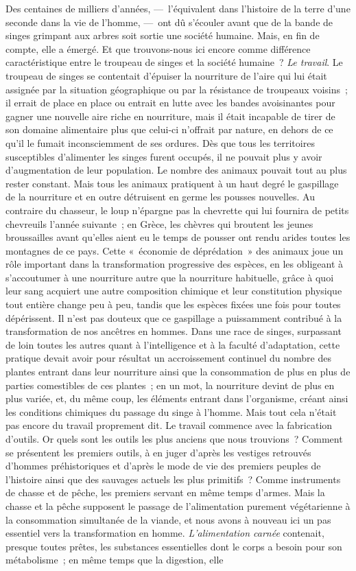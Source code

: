 \documentclass[french,twoside]{book} %
\begin{document}
Des centaines de milliers d’années, — l’équivalent dans l’histoire de la terre d’une seconde dans la vie de l’homme, — ont dû s’écouler avant que de la bande de singes grimpant aux arbres soit sortie une société humaine. Mais, en fin de compte, elle a émergé. Et que trouvons-nous ici encore comme différence caractéristique entre le troupeau de singes et la société humaine ? \emph{Le travail}. Le troupeau de singes se contentait d’épuiser la nourriture de l’aire qui lui était assignée par la situation géographique ou par la résistance de troupeaux voisins ; il errait de place en place ou entrait en lutte avec les bandes avoisinantes pour gagner une nouvelle aire riche en nourriture, mais il était incapable de tirer de son domaine alimentaire plus que celui-ci n’offrait par nature, en dehors de ce qu’il le fumait inconsciemment de ses ordures. Dès que tous les territoires susceptibles d’alimenter les singes furent occupés, il ne pouvait plus y avoir d’augmentation de leur population. Le nombre des animaux pouvait tout au plus rester constant. Mais tous les animaux pratiquent à un haut degré le gaspillage de la nourriture et en outre détruisent en germe les pousses nouvelles. Au contraire du chasseur, le loup n’épargne pas la chevrette qui lui fournira de petits chevreuils l’année suivante ; en Grèce, les chèvres qui broutent les jeunes broussailles avant qu’elles aient eu le temps de pousser ont rendu arides toutes les montagnes de ce pays. Cette « économie de déprédation » des animaux joue un rôle important dans la transformation progressive des espèces, en les obligeant à s’accoutumer à une nourriture autre que la nourriture habituelle, grâce à quoi leur sang acquiert une autre composition chimique et leur constitution physique tout entière change peu à peu, tandis que les espèces fixées une fois pour toutes dépérissent. Il n’est pas douteux que ce gaspillage a puissamment contribué à la transformation de nos ancêtres en hommes. Dans une race de singes, surpassant de loin toutes les autres quant à l’intelligence et à la faculté d’adaptation, cette pratique devait avoir pour résultat un accroissement continuel du nombre des plantes entrant dans leur nourriture ainsi que la consommation de plus en plus de parties comestibles de ces plantes ; en un mot, la nourriture devint de plus en plus variée, et, du même coup, les éléments entrant dans l’organisme, créant ainsi les conditions chimiques du passage du singe à l’homme. Mais tout cela n’était pas encore du travail proprement dit. Le travail commence avec la fabrication d’outils. Or quels sont les outils les plus anciens que nous trouvions ? Comment se présentent les premiers outils, à en juger d’après les vestiges retrouvés d’hommes préhistoriques et d’après le mode de vie des premiers peuples de l’histoire ainsi que des sauvages actuels les plus primitifs ? Comme instruments de chasse et de pêche, les premiers servant en même temps d’armes. Mais la chasse et la pêche supposent le passage de l’alimentation purement végétarienne à la consommation simultanée de la viande, et nous avons à nouveau ici un pas essentiel vers la transformation en homme. \emph{L’alimentation carnée} contenait, presque toutes prêtes, les substances essentielles dont le corps a besoin pour son métabolisme ; en même temps que la digestion, elle 
\end{document}
